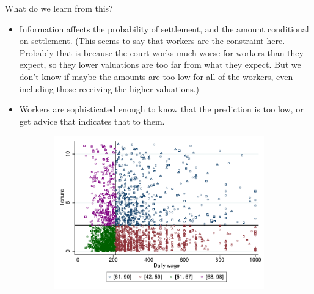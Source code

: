 \documentclass[oneside,11pt]{article}
\begin{document}
What do we learn from this? 
\begin{itemize}
    \item Information affects the probability of settlement, and the amount conditional on settlement. (This seems to say that workers are the constraint here. Probably that is because the court works much worse for workers than they expect, so they lower valuations are too far from what they expect. But we don't know if maybe the amounts are too low for all of the workers, even including those receiving the higher valuations.)
    \item Workers are sophisticated enough to know that the prediction is too low, or get advice that indicates that to them.
\end{itemize}




\newpage


\clearpage

%
%






\newpage
\singlespacing



\begin{figure}[H]
     \caption{RD design}
    \label{rd_design}
\begin{center}
\begin{subfigure}{0.75\textwidth}
        \includegraphics[width=\textwidth]{Figuras/scatter_rddesign.pdf}
    \end{subfigure}
  \end{center}
    \scriptsize 
\end{figure}
\end{document}
